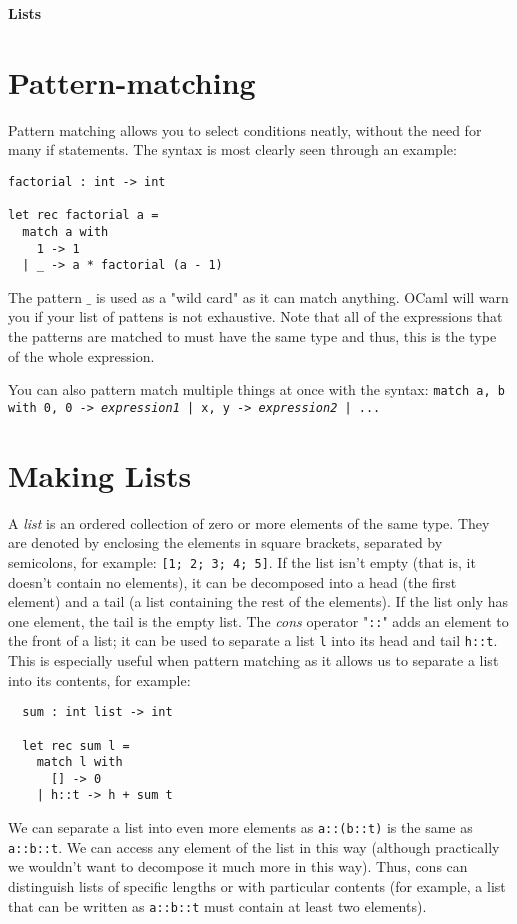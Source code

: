 \documentclass[12pt]{article}
\begin{document}
\begin{center}\LARGE\bf
    Lists
\end{center}

\section{Pattern-matching}
Pattern matching allows you to select conditions neatly, without the need for many if statements. The
syntax is most clearly seen through an example:
\begin{lstlisting}
factorial : int -> int

let rec factorial a =
  match a with
    1 -> 1
  | _ -> a * factorial (a - 1)
\end{lstlisting}
The pattern $\_$ is used as a "wild card" as it can match anything. OCaml will warn you if your list of pattens is not
exhaustive. Note that all of the expressions that the patterns are matched to must have the same type and
thus, this is the type of the whole expression.

You can also pattern match multiple things at once with the syntax:
\newline \texttt{match a, b with 0, 0 -> \textit{expression1} | x, y -> \textit{expression2} | ...}

\section{Making Lists}
A \textit{list} is an ordered collection of zero or more elements of the same type. They are denoted by enclosing the elements in
square brackets, separated by semicolons, for example: \texttt{[1; 2; 3; 4; 5]}. If the list isn't empty (that is, it
doesn't contain no elements), it can be decomposed into a head (the first element) and a tail (a list containing the rest of the elements).
If the list only has one element, the tail is the empty list.
The \textit{cons} operator "\texttt{::}" adds an element to the front of a list; it can be used to separate a list \texttt{l}
into its head and tail \texttt{h::t}. This is especially useful when pattern matching as it allows us to separate
a list into its contents, for example:
\begin{lstlisting}
  sum : int list -> int

  let rec sum l =
    match l with
      [] -> 0
    | h::t -> h + sum t
\end{lstlisting}

We can separate a list into even more elements as \texttt{a::(b::t)} is the same as \texttt{a::b::t}. We can access any element of the
list in this way (although practically we wouldn't want to decompose it much more in this way). Thus, cons can distinguish lists of
  specific lengths or with particular contents (for example, a list that can be written as \texttt{a::b::t} must contain at least two
elements).
\end{document}
